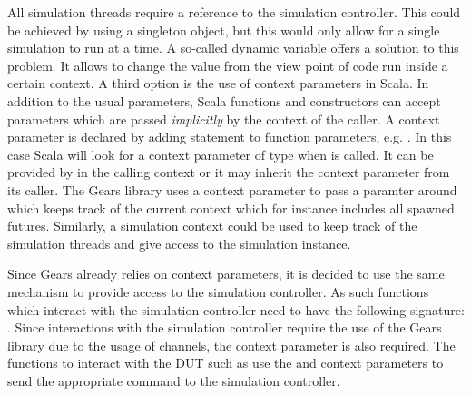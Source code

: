 All simulation threads require a reference to the simulation controller. This could be achieved by using a singleton
object, but this would only allow for a single simulation to run at a time. A so-called dynamic variable offers a solution to this problem. It allows to change the value from the view point of code run inside a certain context. 
A third option is the use of context parameters in Scala. In addition to the usual parameters, Scala functions and constructors can accept parameters which are passed \textit{implicitly} by the context of the caller. A context parameter is declared by adding  statement to function parameters, e.g. . In this case Scala will look for a context parameter of type  when  is called. It can be provided by  in the calling context or it may inherit the context parameter from its caller. The Gears library uses a context parameter to pass a  paramter around which keeps track of the current context which for instance includes all spawned futures. Similarly, a simulation context could be used to keep track of the simulation threads and give access to the simulation instance.

Since Gears already relies on context parameters, it is decided to use the same mechanism to provide access to the simulation controller. As such functions which interact with the simulation controller need to have the
following signature: . Since interactions with the simulation controller require the use of the Gears library due to the usage of channels, the 
context parameter is also required. The functions to interact with the DUT such as  use the
 and  context parameters to send the appropriate command to the simulation controller.

